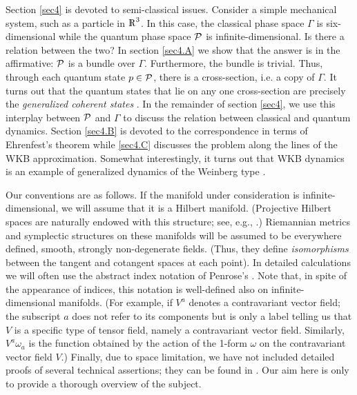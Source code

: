 Section \ref{sec4} is devoted to semi-classical issues. Consider a
simple mechanical system, such as a particle in $\R^3$. In this case,
the classical phase space $\Gamma$ is six-dimensional while the
quantum phase space $\P$ is infinite-dimensional. Is there a relation
between the two? In section \ref{sec4.A} we show that the answer is in
the affirmative: $\P$ is a bundle over $\Gamma$. Furthermore, the
bundle is trivial. Thus, through each quantum state $p\in \P$, there
is a cross-section, i.e. a copy of $\Gamma$. It turns out that the
quantum states that lie on any one cross-section are precisely the
{\it generalized coherent states} \cite{perelomov,gilmore,klauder}. In
the remainder of section \ref{sec4}, we use this interplay between
$\P$ and $\Gamma$ to discuss the relation between classical and
quantum dynamics.  Section \ref{sec4.B} is devoted to the
correspondence in terms of Ehrenfest's theorem while \ref{sec4.C}
discusses the problem along the lines of the WKB
approximation. Somewhat interestingly, it turns out that WKB dynamics
is an example of generalized dynamics of the Weinberg type
\cite{weinberg}.

Our conventions are as follows. If the manifold under consideration is
infinite-dimensional, we will assume that it is a Hilbert
manifold. (Projective Hilbert spaces are naturally endowed with this
structure; see, e.g., \cite{thesis}.) Riemannian metrics and
symplectic structures on these manifolds will be assumed to be
everywhere defined, smooth, strongly non-degenerate fields. (Thus,
they define {\it isomorphisms} between the tangent and cotangent
spaces at each point). In detailed calculations we will often use the
abstract index notation of Penrose's \cite{rp2,indices}.  Note that,
in spite of the appearance of indices, this notation is well-defined
also on infinite-dimensional manifolds. (For example, if $V^a$ denotes
a contravariant vector field; the subscript $a$ does not refer to its
components but is only a label telling us that $V$ is a specific type
of tensor field, namely a contravariant vector field. Similarly,
$V^a\omega_a$ is the function obtained by the action of the 1-form
$\omega$ on the contravariant vector field $V$.)  Finally, due to
space limitation, we have not included detailed proofs of several
technical assertions; they can be found in \cite{thesis}. Our aim here
is only to provide a thorough overview of the subject.

